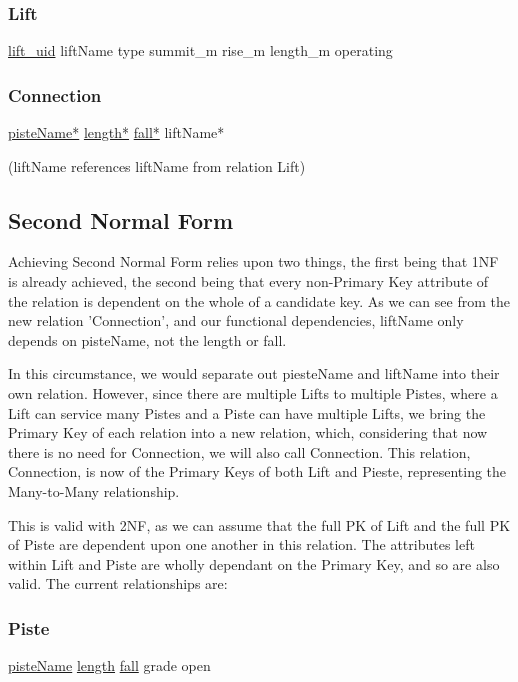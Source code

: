 \documentclass[11pt]{scrartcl} %
\begin{document}
\subsubsection{Lift}
\underline{lift\_uid}\newline
liftName\newline
type\newline
summit\_m\newline
rise\_m\newline
length\_m\newline
operating

\subsubsection{Connection}
\underline{pisteName*}\newline
\underline{length*}\newline
\underline{fall*}\newline
liftName*

(liftName references liftName from relation Lift)

\subsection{Second Normal Form}
Achieving Second Normal Form relies upon two things, the first being that 1NF is already achieved, the second being that every non-Primary Key attribute of the relation is dependent on the whole of a candidate key. As we can see from the new relation 'Connection', and our functional dependencies, liftName only depends on pisteName, not the length or fall.

In this circumstance, we would separate out piesteName and liftName into their own relation. However, since there are multiple Lifts to multiple Pistes, where a Lift can service many Pistes and a Piste can have multiple Lifts, we bring the Primary Key of each relation into a new relation, which, considering that now there is no need for Connection, we will also call Connection. This relation, Connection, is now of the Primary Keys of both Lift and Pieste, representing the Many-to-Many relationship.

This is valid with 2NF, as we can assume that the full PK of Lift and the full PK of Piste are dependent upon one another in this relation. The attributes left within Lift and Piste are wholly dependant on the Primary Key, and so are also valid. The current relationships are:

\subsubsection{Piste}
\underline{pisteName}\newline
\underline{length}\newline
\underline{fall}\newline
grade\newline
open
\end{document}
